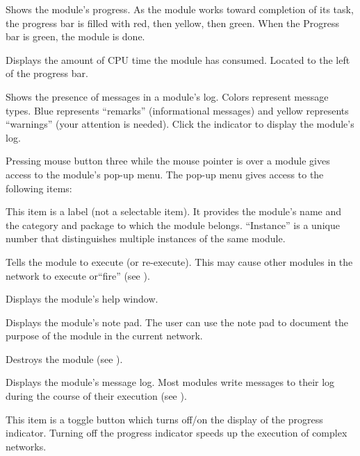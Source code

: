 \begin{description}
   Shows the module's progress.  As the module
  works toward completion of its task, the progress bar is filled
  with red, then yellow, then green.  When the Progress bar
  is green, the module is done.
  
   Displays the amount of CPU time the module has
  consumed.  Located to the left of the progress bar.
  
   Shows the presence of messages in a
  module's log.  Colors represent message types.  Blue represents
  ``remarks'' (informational messages) and yellow represents ``warnings''
  (your attention is needed).  Click the indicator to display the
  module's log.

 Pressing mouse button three while the mouse
  pointer is over a module gives access to the module's pop-up menu.  The
  pop-up menu gives access to the following items:
  \begin{description}
     This item is a
    label (not a selectable item).  It provides the module's name and
    the category and package to which the module belongs. 
    ``Instance'' is a unique number that distinguishes multiple
    instances of the same module.

     Tells the module to
    execute (or re-execute).  This may cause other modules in the
    network to execute or``fire''
    (see ).

     Displays the module's help window.
    
     Displays the module's note pad.
    The user can use the note pad to document the purpose of the module in
    the current network.

     Destroys the module (see ).
    
     Displays the module's message log.  Most
    modules write messages to their log during the course of
    their execution (see ).
    
     This item is a toggle button which
    turns off/on the display of the progress indicator.  Turning off
    the progress indicator speeds up the execution of complex
    networks.
  \end{description}
\end{description}

